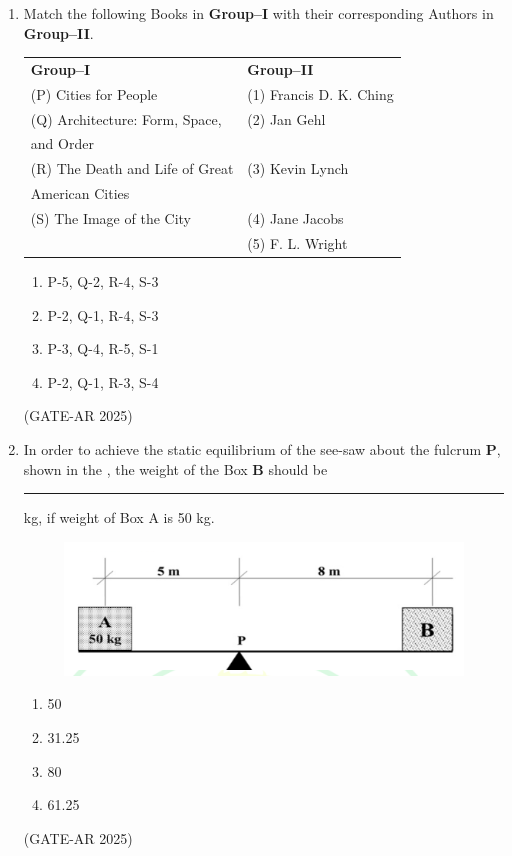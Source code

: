 \documentclass[a4paper,10pt]{article}
\begin{document}
\begin{enumerate}
\item Match the following Books in \textbf{Group–I} with their corresponding Authors in \textbf{Group–II}. \\
\begin{tabular}{ l l }
\textbf{Group–I} & \textbf{Group–II} \\
(P) Cities for People & (1) Francis D. K. Ching \\
(Q) Architecture: Form, Space, & (2) Jan Gehl \\
and Order & \\
(R) The Death and Life of Great & (3) Kevin Lynch \\
American Cities & \\
(S) The Image of the City & (4) Jane Jacobs \\
& (5) F. L. Wright \\
\end{tabular}
\begin{multicols}{2}
\begin{enumerate}
    \item P-5, Q-2, R-4, S-3
    \item P-2, Q-1, R-4, S-3
    \item P-3, Q-4, R-5, S-1
    \item P-2, Q-1, R-3, S-4
\end{enumerate}
\end{multicols}
\hfill (GATE-AR 2025)

\item In order to achieve the static equilibrium of the see-saw about the fulcrum \textbf{P}, shown in the , the weight of the Box \textbf{B} should be \rule{2cm}{0.4pt} kg, if weight of Box A is 50 kg.
\begin{figure}[h!]
\centering
\includegraphics[width=0.5\columnwidth]{figs/06.jpg}
\caption{}
\label{fig:Img06}
\end{figure}
\begin{multicols}{4}
\begin{enumerate}
    \item 50
    \item 31.25
    \item 80
    \item 61.25
\end{enumerate}
\end{multicols}
\hfill (GATE-AR 2025)


\end{enumerate}
\end{document}
